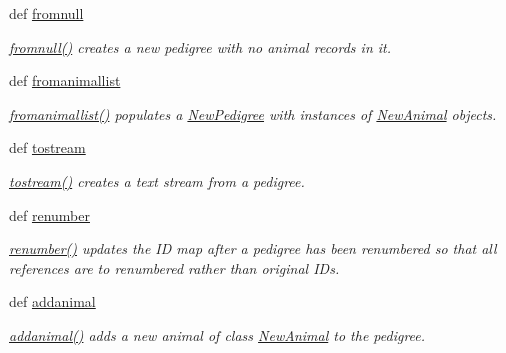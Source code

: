 \begin{DoxyCompactItemize}
def \hyperlink{classPyPedal_1_1pyp__newclasses_1_1NewPedigree_a93805b88a410473cb9dda5457d46a61d}{fromnull}
\begin{DoxyCompactList}\small\item\em \hyperlink{classPyPedal_1_1pyp__newclasses_1_1NewPedigree_a93805b88a410473cb9dda5457d46a61d}{fromnull()} creates a new pedigree with no animal records in it. \end{DoxyCompactList}\item 
def \hyperlink{classPyPedal_1_1pyp__newclasses_1_1NewPedigree_a707dc2388b0f0e5f740d4e82738c149c}{fromanimallist}
\begin{DoxyCompactList}\small\item\em \hyperlink{classPyPedal_1_1pyp__newclasses_1_1NewPedigree_a707dc2388b0f0e5f740d4e82738c149c}{fromanimallist()} populates a \hyperlink{classPyPedal_1_1pyp__newclasses_1_1NewPedigree}{NewPedigree} with instances of \hyperlink{classPyPedal_1_1pyp__newclasses_1_1NewAnimal}{NewAnimal} objects. \end{DoxyCompactList}\item 
def \hyperlink{classPyPedal_1_1pyp__newclasses_1_1NewPedigree_a7b8f4dca3f231f6d487fee90e38e21c7}{tostream}
\begin{DoxyCompactList}\small\item\em \hyperlink{classPyPedal_1_1pyp__newclasses_1_1NewPedigree_a7b8f4dca3f231f6d487fee90e38e21c7}{tostream()} creates a text stream from a pedigree. \end{DoxyCompactList}\item 
def \hyperlink{classPyPedal_1_1pyp__newclasses_1_1NewPedigree_aef198ff1c3c2ac1c666486deb2d2e92a}{renumber}
\begin{DoxyCompactList}\small\item\em \hyperlink{classPyPedal_1_1pyp__newclasses_1_1NewPedigree_aef198ff1c3c2ac1c666486deb2d2e92a}{renumber()} updates the ID map after a pedigree has been renumbered so that all references are to renumbered rather than original IDs. \end{DoxyCompactList}\item 
def \hyperlink{classPyPedal_1_1pyp__newclasses_1_1NewPedigree_a6537e2f0a419e0736b500c560b9f6194}{addanimal}
\begin{DoxyCompactList}\small\item\em \hyperlink{classPyPedal_1_1pyp__newclasses_1_1NewPedigree_a6537e2f0a419e0736b500c560b9f6194}{addanimal()} adds a new animal of class \hyperlink{classPyPedal_1_1pyp__newclasses_1_1NewAnimal}{NewAnimal} to the pedigree. \end{DoxyCompactList}\item 

\end{DoxyCompactItemize}
